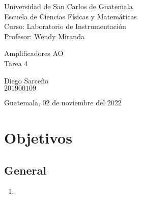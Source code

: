 \documentclass[conference]{IEEEtran}
\begin{document}
\begin{titlepage}



\begin{flushleft}
    Universidad de San Carlos de Guatemala \\
    Escuela de Ciencias Físicas y Matemáticas \\
    Curso: Laboratorio de Instrumentación \\
    Profesor: Wendy Miranda
\end{flushleft}

\vspace{6cm}

\begin{center}
    \huge{Amplificadores AO} \\[1cm]
    \large{Tarea 4}
\end{center}

\vspace{10.5cm}

\begin{flushright}
    Diego Sarceño \\
    $201900109$
\end{flushright}

\vspace{0.5cm}

\begin{center}
    Guatemala, 02 de noviembre del 2022
\end{center}

\end{titlepage}



\begin{abstract}
    
\end{abstract}

\begin{IEEEkeywords}
    
\end{IEEEkeywords}

\section{Objetivos}

\subsection{General}
    \begin{enumerate}[1.]
        \item 
    \end{enumerate}
\end{document}
